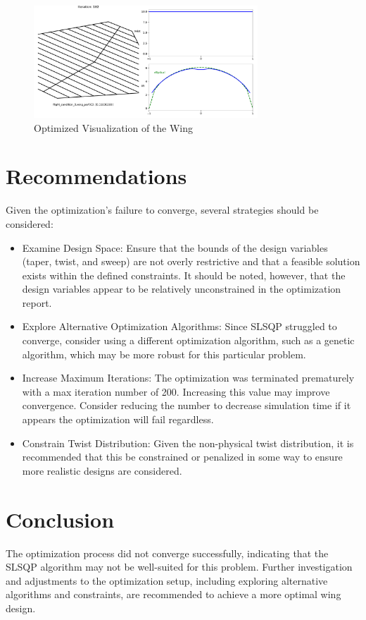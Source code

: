 \documentclass{article}
\begin{document}
\begin{figure}[h!]
    \centering
    \includegraphics[width=0.75\textwidth]{./Optimized_Wing.pdf}
    \caption{Optimized Visualization of the Wing}
    \label{fig:optimized_wing}
\end{figure}


\section{Recommendations}
Given the optimization's failure to converge, several strategies should be considered:
\begin{itemize}
    \item Examine Design Space: Ensure that the bounds of the design variables (taper, twist, and sweep) are not overly restrictive and that a feasible solution exists within the defined constraints.  It should be noted, however, that the design variables appear to be relatively unconstrained in the optimization report.
    \item Explore Alternative Optimization Algorithms: Since SLSQP struggled to converge, consider using a different optimization algorithm, such as a genetic algorithm, which may be more robust for this particular problem.
    \item Increase Maximum Iterations: The optimization was terminated prematurely with a max iteration number of 200. Increasing this value may improve convergence. Consider reducing the number to decrease simulation time if it appears the optimization will fail regardless.
    \item Constrain Twist Distribution: Given the non-physical twist distribution, it is recommended that this be constrained or penalized in some way to ensure more realistic designs are considered.
\end{itemize}

\section{Conclusion}
The optimization process did not converge successfully, indicating that the SLSQP algorithm may not be well-suited for this problem. Further investigation and adjustments to the optimization setup, including exploring alternative algorithms and constraints, are recommended to achieve a more optimal wing design.
\end{document}

